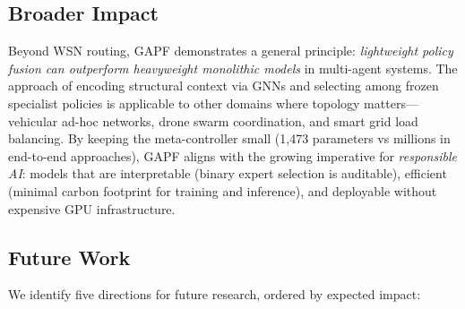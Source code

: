 \documentclass[12pt, onecolumn, journal]{IEEEtran}
\begin{document}
\subsection{Broader Impact}

Beyond WSN routing, GAPF demonstrates a general principle: \emph{lightweight policy fusion can outperform heavyweight monolithic models} in multi-agent systems. The approach of encoding structural context via GNNs and selecting among frozen specialist policies is applicable to other domains where topology matters---vehicular ad-hoc networks, drone swarm coordination, and smart grid load balancing. By keeping the meta-controller small (1{,}473 parameters vs millions in end-to-end approaches), GAPF aligns with the growing imperative for \emph{responsible AI}: models that are interpretable (binary expert selection is auditable), efficient (minimal carbon footprint for training and inference), and deployable without expensive GPU infrastructure.

\subsection{Future Work}

We identify five directions for future research, ordered by expected impact:
\end{document}
